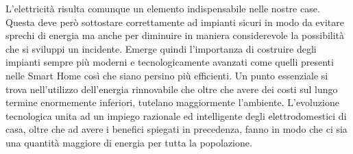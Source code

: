 L’elettricità risulta comunque un elemento indispensabile nelle nostre case. Questa deve però sottostare correttamente ad impianti sicuri in modo da evitare sprechi di energia ma anche per diminuire in maniera considerevole la possibilità che si sviluppi un incidente. Emerge quindi l’importanza di costruire degli impianti sempre più moderni e tecnologicamente avanzati come quelli presenti nelle Smart Home così che siano persino più efficienti. Un punto essenziale si trova nell’utilizzo dell’energia rinnovabile che oltre che avere dei costi sul lungo termine enormemente inferiori,  tutelano maggiormente l’ambiente. L’evoluzione tecnologica unita ad un impiego razionale ed intelligente degli elettrodomestici di casa, oltre che ad avere i benefici spiegati in precedenza, fanno in modo che ci sia una quantità maggiore di energia per tutta la popolazione.
